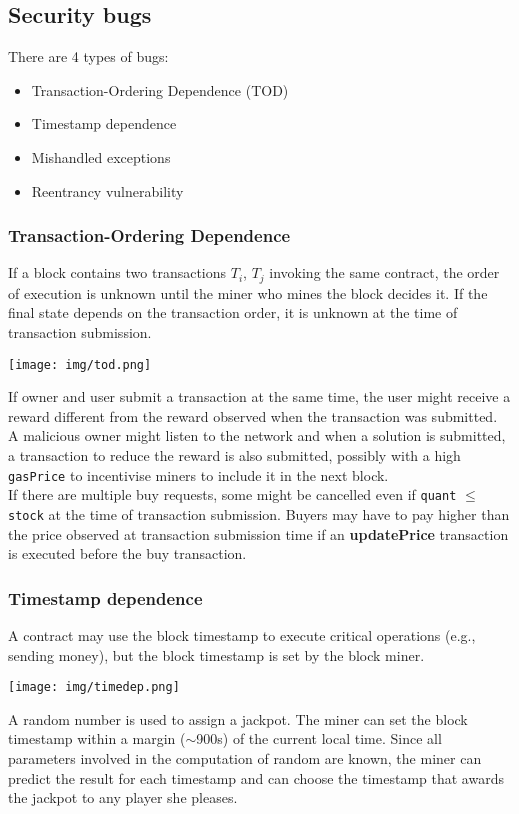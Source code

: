 \documentclass[a4paper, 10pt, titlepage]{article}
\begin{document}
\subsection{Security bugs}
There are 4 types of bugs:
\begin{itemize}
\item Transaction-Ordering Dependence (TOD)
\item Timestamp dependence
\item Mishandled exceptions
\item Reentrancy vulnerability
\end{itemize}

\subsubsection{Transaction-Ordering Dependence}
If a block contains two transactions $T_i$, $T_j$ invoking the same contract, the order of execution is unknown until the miner who mines the block decides it. If the final state depends on the transaction order, it is unknown at the time of transaction submission. 
\begin{center}
\texttt{[image: img/tod.png]}
\end{center}
If owner and user submit a transaction at the same time, the user might receive a reward different from the reward observed when the transaction was submitted. A malicious owner might listen to the network and when a solution is submitted, a transaction to reduce the reward is also submitted, possibly with a high \lstinline|gasPrice| to incentivise miners to include it in the next block. \medskip\\
If there are multiple buy requests, some might be cancelled even if \lstinline|quant| $\leq$ \lstinline|stock| at the time of transaction submission. Buyers may have to pay higher than the price observed at transaction submission time if an \textbf{updatePrice} transaction is executed before the buy transaction.

\subsubsection{Timestamp dependence}
A contract may use the block timestamp to execute critical operations (e.g., sending money), but the block timestamp is set by the block miner. 
\begin{center}
\texttt{[image: img/timedep.png]}
\end{center}
A random number is used to assign a jackpot. The miner can set the block timestamp within a margin ($\sim$900s) of the current local time. Since all parameters involved in the computation of random are known, the miner can predict the result for each timestamp and can choose the timestamp that awards the jackpot to any player she pleases.
\end{document}
